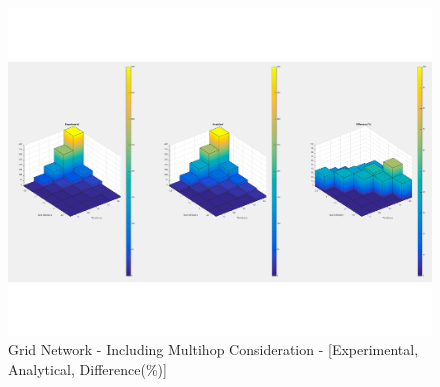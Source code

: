 \documentclass[conference]{IEEEtran}
\begin{document}
\begin{figure}
    \includegraphics[scale=0.65]{result_expl_figs/grid_IS_100_CR_2_mhop.pdf}
    \caption{Grid Network - Including Multihop Consideration - [Experimental, Analytical, Difference(\%)]}
    \label{fig:grid_net_uni_mhop}
\end{figure}

%








%
%
%











\end{document}

